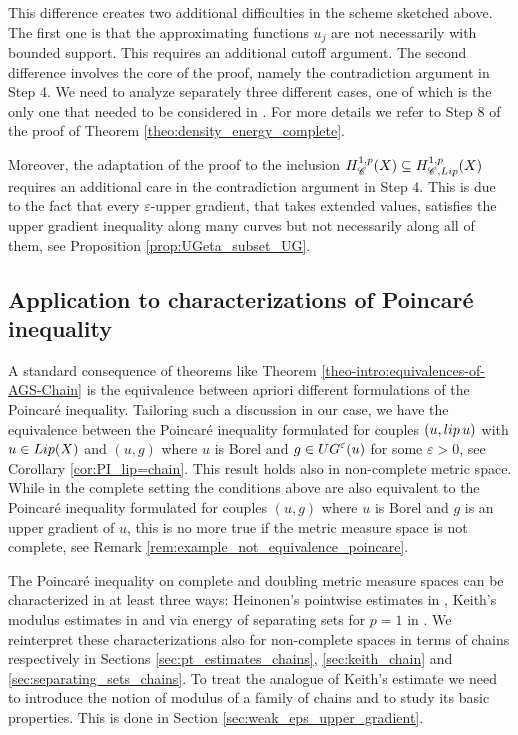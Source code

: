 \documentclass[12pt]{amsart}
\newcommand{\X}{{\rm X}}
\newcommand{\lip}{{\rm lip}}
\newcommand{\Lip}{{\rm Lip}}
\theoremstyle{definition}
\newcommand{\Chain}[1]{\mathscr{C}^{#1}}
\newcommand{\UG}[1]{{\rm UG}^{#1}}
\newcommand{\HH}[2]{H^{1,#1}_{{\rm #2}}}
\begin{document}
This difference creates two additional difficulties in the scheme sketched above. The first one is that the approximating functions $u_j$ are not necessarily with bounded support. This requires an additional cutoff argument.
The second difference involves the core of the proof, namely the contradiction argument in Step 4. We need to analyze separately three different cases, one of which is the only one that needed to be considered in \cite{Eriksson-Bique-Density-in-energy}. For more details we refer to Step 8 of the proof of Theorem \ref{theo:density_energy_complete}.

Moreover, the adaptation of the proof to the inclusion $\HH{p}{\Chain{}}(\X) \subseteq \HH{p}{\Chain{},\Lip}(\X)$ requires an additional care in the contradiction argument in Step 4. This is due to the fact that every $\varepsilon$-upper gradient, that takes extended values, satisfies the upper gradient inequality along many curves but not necessarily along all of them, see Proposition \ref{prop:UGeta_subset_UG}.

\subsection{Application to characterizations of Poincar\'{e} inequality}
%
A standard consequence of theorems like Theorem \ref{theo-intro:equivalences-of-AGS-Chain} is the equivalence between apriori different formulations of the Poincar\'{e} inequality. Tailoring such a discussion in our case, we have the equivalence between the Poincar\'{e} inequality formulated for couples $(u, \lip\, u)$ with $u\in \Lip(\X)$ and $(u,g)$ where $u$ is Borel and $g \in \UG{\varepsilon}(u)$ for some $\varepsilon >0$, see Corollary \ref{cor:PI_lip=chain}. This result holds also in non-complete metric space. While in the complete setting the conditions above are also equivalent to the Poincar\'{e} inequality formulated for couples $(u,g)$ where $u$ is Borel and $g$ is an upper gradient of $u$, this is no more true if the metric measure space is not complete, see Remark \ref{rem:example_not_equivalence_poincare}.

The Poincaré inequality on complete and doubling metric measure spaces can be characterized in at least three ways: Heinonen's pointwise estimates in \cite{Hei01}, Keith's modulus estimates in \cite{Kei03} and via energy of separating sets for $p=1$ in \cite{CaputoCavallucci2024}.
We reinterpret these characterizations also for non-complete spaces in terms of chains respectively in Sections \ref{sec:pt_estimates_chains}, \ref{sec:keith_chain} and \ref{sec:separating_sets_chains}. To treat the analogue of Keith's estimate we need to introduce the notion of modulus of a family of chains and to study its basic properties. This is done in Section \ref{sec:weak_eps_upper_gradient}.
\end{document}
